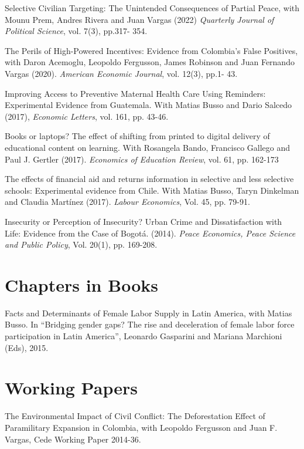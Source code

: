\documentclass{moderncv}
\begin{document}
{Selective Civilian Targeting: The Unintended Consequences of Partial Peace, with Mounu Prem, Andres Rivera and Juan Vargas (2022) \emph{Quarterly Journal of Political Science}, vol. 7(3), pp.317- 354. \\}

{The Perils of High-Powered Incentives: Evidence from Colombia's False Positives, with Daron Acemoglu, Leopoldo Fergusson, James Robinson and Juan Fernando Vargas (2020). \emph{American Economic Journal}, vol. 12(3), pp.1- 43. \\ }  

{Improving Access to Preventive Maternal Health Care Using Reminders: Experimental Evidence from Guatemala. With Matias Busso and Dario Salcedo (2017), \emph{Economic Letters}, vol. 161, pp. 43-46.\\} 

{Books or laptops? The effect of shifting from printed to digital delivery of educational content on learning. With Rosangela Bando, Francisco Gallego and Paul J. Gertler (2017). \emph{Economics of Education Review}, vol. 61, pp. 162-173\\} 

{The effects of financial aid and returns information in selective and less selective schools: Experimental evidence from Chile. With Matias Busso, Taryn Dinkelman and Claudia Martínez (2017). \emph{Labour Economics}, Vol. 45, pp. 79-91.\\}

{Insecurity or Perception of Insecurity? Urban Crime and Dissatisfaction with Life: Evidence from the Case of Bogot\'a. (2014). \emph{Peace Economics, Peace Science and Public Policy}, Vol. 20(1), pp. 169-208.}

\section{\textbf{Chapters in Books}}
{Facts and Determinants of Female Labor Supply in Latin America, with Matias Busso. In “Bridging gender gaps? The rise and deceleration of female labor force participation in Latin America”, Leonardo Gasparini and Mariana Marchioni (Eds), 2015.}

\section{\textbf{Working Papers}}
{The Environmental Impact of Civil Conflict: The Deforestation Effect of Paramilitary Expansion in Colombia, with Leopoldo Fergusson and Juan F. Vargas, Cede Working Paper 2014-36.}
\end{document}

